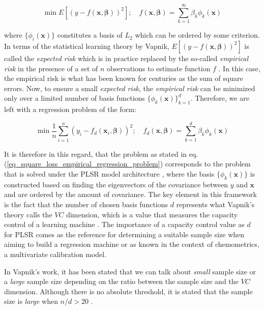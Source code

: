 \documentclass[journal=ancham,manuscript=article]{achemso}
\begin{document}
\begin{equation}
    \min E \left[ (y-f(\mathbf{x}, \boldsymbol{\beta}))^2\right]; \quad f(\mathbf{x}, \boldsymbol{\beta}) = \sum_{k=1}^{\infty} \beta_k \phi_{k}(\mathbf{x})
    \label{eq_general_regression_problem}
\end{equation}

where $\{\phi_{i}(\mathbf{x})\}$ constitutes a basis of $L_2$ which can be ordered by some criterion. In terms of the statistical learning theory by Vapnik, $E \left[ (y-f(\mathbf{x}, \boldsymbol{\beta}))^2\right]$ is called the \emph{expected risk} which is in practice replaced by the so-called \emph{empirical risk} in the presence of a set of $n$ observations to estimate function $f$ \cite{Vapnik2000}. In this case, the empirical risk is what has been known for centuries as the sum of square errors. Now, to ensure a small \emph{expected risk}, the \emph{empirical risk} can be minimized only over a limited number of basis functions $\{\phi_{k}(\mathbf{x})\}_{k=1}^d$. Therefore, we are left with a regression problem of the form:

\begin{equation}
    \min \frac{1}{n} \sum_{i=1}^n (y_i-f_d(\mathbf{x}_i, \boldsymbol{\beta}))^2; \quad f_d(\mathbf{x}, \boldsymbol{\beta}) = \sum_{k=1}^{d} \beta_k \phi_{k}(\mathbf{x})
    \label{eq_square_loss_empirical_regression_problem}
\end{equation}

It is therefore in this regard, that the problem as stated in eq. (\ref{eq_square_loss_empirical_regression_problem}) corresponds to the problem that is solved under the PLSR model architecture \cite{Stone1990}, where the basis $\{\phi_{k}(\mathbf{x})\}$ is constructed based on finding the eigenvectors of the covariance between $y$ and $\mathbf{x}$ and are ordered by the amount of covariance. The key element in this framework is the fact that the number of chosen basis functions $d$ represents what Vapnik's theory calls the $VC$ dimension, which is a value that measures the capacity control of a learning machine \cite{Vapnik2019}. The importance of a capacity control value as $d$ for PLSR comes as the reference for determining a suitable sample size when aiming to build a regression machine or as known in the context of chemometrics, a multivariate calibration model. 

In Vapnik's work, it has been stated that we can talk about \emph{small} sample size or a \emph{large} sample size depending on the ratio between the sample size and the $VC$ dimension. Although there is no absolute threshold, it is stated that the sample size is \emph{large} when  $n/d>20$ \cite{Vapnik2000}.
\end{document}
